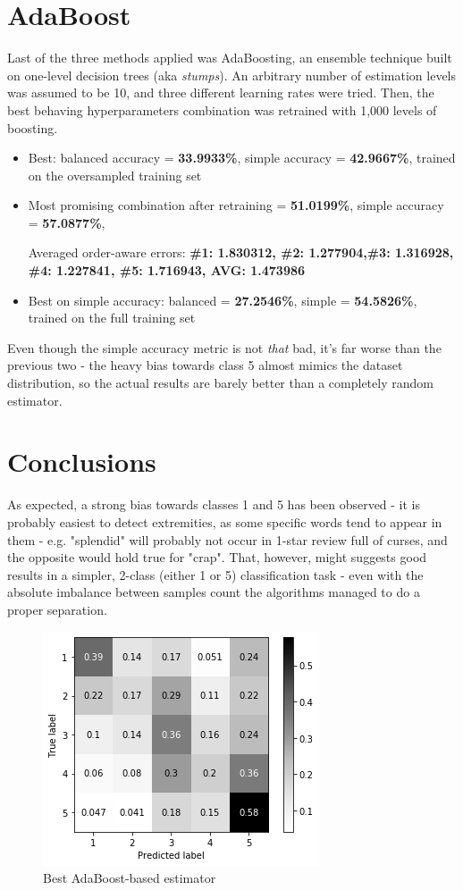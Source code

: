 \documentclass[letterpaper]{article}
\begin{document}
\section{AdaBoost}
Last of the three methods applied was AdaBoosting, an ensemble technique built on one-level decision trees
(aka \textit{stumps}).
An arbitrary number of estimation levels was assumed to be 10, and three different learning rates were tried.
Then, the best behaving hyperparameters combination was retrained with 1,000 levels of boosting.

\begin{itemize}
    \item Best: balanced accuracy = \textbf{33.9933\%}, simple accuracy = \textbf{42.9667\%},
    trained on the oversampled training set
    \item Most promising combination after retraining = \textbf{51.0199\%}, simple accuracy = \textbf{57.0877\%},
    
    Averaged order-aware errors:
    \textbf{\#1: 1.830312,	\#2: 1.277904,\#3: 1.316928,	\#4: 1.227841,	\#5: 1.716943,	AVG: 1.473986}
    \item Best on simple accuracy: balanced = \textbf{27.2546\%}, simple = \textbf{54.5826\%},
    trained on the full training set
\end{itemize}

Even though the simple accuracy metric is not \textit{that} bad, it's far worse than the previous two - 
the heavy bias towards class 5 almost mimics the dataset distribution, so the actual results are barely better than
a completely random estimator.

\section{Conclusions}
As expected, a strong bias towards classes 1 and 5 has been observed - it is probably easiest to detect extremities,
as some specific words tend to appear in them - e.g. "splendid" will probably not occur in 1-star review full of curses,
and the opposite would hold true for "crap".
That, however, might suggests good results in a simpler, 2-class (either 1 or 5) classification task - even with
the absolute imbalance between samples count the algorithms managed to do a proper separation.

\begin{figure}[h]
    \centering
    \includegraphics[scale=0.65]{adaboost-best.png}
    \caption{Best AdaBoost-based estimator}
\end{figure}
\end{document}
